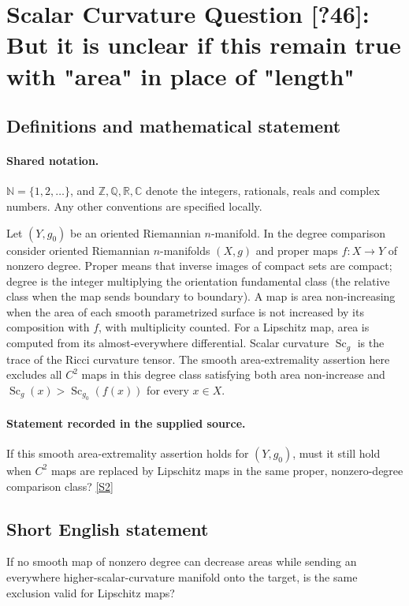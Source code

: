 \documentclass[11pt]{article}
\newcommand{\sref}[2]{\hyperlink{source:#1:#2}{[S#2]}}
\begin{document}
\section{Scalar Curvature Question [?46]: But it is unclear if this remain true with "area" in place of "length"}\label{statement}

\subsection{Definitions and mathematical statement}

\paragraph{Shared notation.}$\mathbb N=\{1,2,\ldots\}$, and $\mathbb Z,\mathbb Q,\mathbb R,\mathbb C$ denote the integers, rationals, reals and complex numbers. Any other conventions are specified locally.


Let $(Y,g_0)$ be an oriented Riemannian $n$-manifold. In the degree comparison consider oriented Riemannian $n$-manifolds $(X,g)$ and proper maps $f:X\to Y$ of nonzero degree. Proper means that inverse images of compact sets are compact; degree is the integer multiplying the orientation fundamental class (the relative class when the map sends boundary to boundary). A map is area non-increasing when the area of each smooth parametrized surface is not increased by its composition with $f$, with multiplicity counted. For a Lipschitz map, area is computed from its almost-everywhere differential. Scalar curvature $\operatorname{Sc}_g$ is the trace of the Ricci curvature tensor. The smooth area-extremality assertion here excludes all $C^2$ maps in this degree class satisfying both area non-increase and $\operatorname{Sc}_g(x)>\operatorname{Sc}_{g_0}(f(x))$ for every $x\in X$.
\paragraph{Statement recorded in the supplied source.}
If this smooth area-extremality assertion holds for $(Y,g_0)$, must it still hold when $C^2$ maps are replaced by Lipschitz maps in the same proper, nonzero-degree comparison class? \sref{statement}{2}
\subsection{Short English statement}
If no smooth map of nonzero degree can decrease areas while sending an everywhere higher-scalar-curvature manifold onto the target, is the same exclusion valid for Lipschitz maps?
\end{document}

